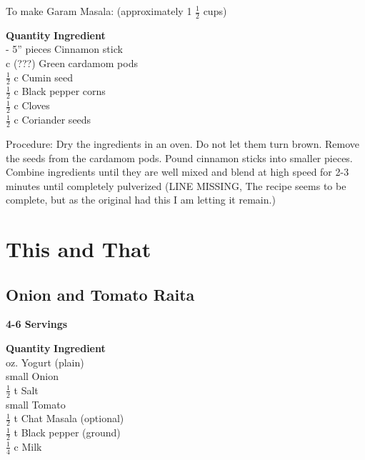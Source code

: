 To make Garam Masala: (approximately 1 $\frac{1}{2}$ cups)
\begin{tabbing}
\hspace{1.0cm}  \={\bf Quantity}   \hspace{3.0cm} \={\bf Ingredient}\\
 - 5'' pieces        \> Cinnamon stick\\
 c (???)        \> Green cardamom pods \\
\>                      $\frac{1}{2}$ c  \> Cumin seed \\
\>                      $\frac{1}{2}$ c  \> Black pepper corns \\
\>                      $\frac{1}{2}$ c  \> Cloves \\
\>                      $\frac{1}{2}$ c  \> Coriander seeds \\
\end{tabbing}

Procedure:\newline
Dry the ingredients in an oven.  Do not let them turn brown.  Remove
the seeds from the cardamom pods. Pound cinnamon sticks into smaller
pieces.  Combine ingredients until they are well mixed and blend at
high speed for 2-3 minutes until completely pulverized
(LINE MISSING, The recipe seems to be complete, but as the original
had this I am letting it remain.)

\chapter{This and That}

\section{Onion and Tomato Raita}
{\bf 4-6 Servings}
\begin{tabbing}
\hspace{1.0cm}  \={\bf Quantity}   \hspace{3.0cm} \={\bf Ingredient}\\
 oz. \> Yogurt (plain)\\
 small    \> Onion\\
\> $\frac{1}{2}$ t \> Salt\\
 small    \> Tomato\\
\> $\frac{1}{2}$ t \> Chat Masala (optional)\\
\> $\frac{1}{2}$ t \> Black pepper (ground)\\
\> $\frac{1}{4}$ c \> Milk\\
\end{tabbing}

